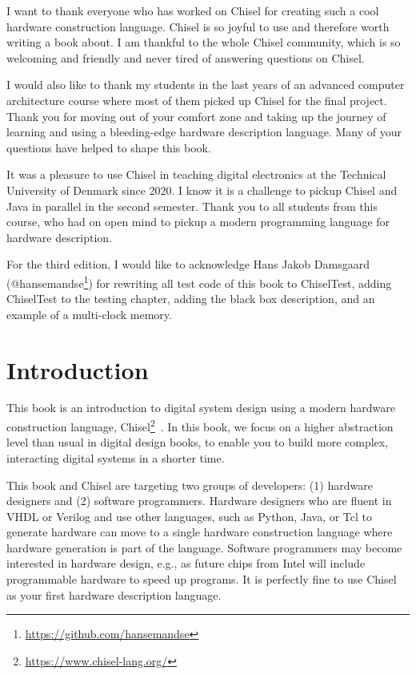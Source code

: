 \documentclass[%
    10pt,
    headinclude, footexclude,
    openright, %
    notitlepage,
    cleardoubleempty,
    headsepline,
    pointlessnumbers,
    bibtotoc, idxtotoc,
    ]{scrbook}
\newcommand{\myref}[2]{\href{#1}{#2}}
\renewcommand{\myref}[2]{{#2}{\footnote{\url{#1}}}}
\begin{document}
I want to thank everyone who has worked on Chisel for creating such
a cool hardware construction language. Chisel is so joyful to use and
therefore worth writing a book about.
I am thankful to the whole Chisel community, which is so welcoming and friendly
and never tired of answering questions on Chisel.

I would also like to thank my students in the last years of an advanced computer
architecture course where most of them picked up Chisel for the final project.
Thank you for moving out of your comfort zone and taking up the journey of
learning and using a bleeding-edge hardware description language.
Many of your questions have helped to shape this book.

It was a pleasure to use Chisel in teaching digital electronics
at the Technical University of Denmark since 2020.
I know it is a challenge to pickup Chisel and Java in parallel in the second
semester. Thank you to all students from this course, who had on open mind to
pickup a modern programming language for hardware description.

For the third edition, I would like to acknowledge Hans Jakob Damsgaard
(\myref{https://github.com/hansemandse}{@hansemandse}) for rewriting
all test code of this book to ChiselTest, adding ChiselTest to the testing chapter, adding the black
box description, and an example of a multi-clock memory.


\mainmatter

\chapter{Introduction}
\label{sec:intro}

This book is an introduction to digital system design using a modern hardware
construction language, \myref{https://www.chisel-lang.org/}{Chisel}~\cite{chisel:dac2012}.
In this book, we focus on a higher abstraction level than usual in digital design books,
to enable you to build more complex, interacting digital systems in a shorter time.

This book and Chisel are targeting two groups of developers:
(1) hardware designers and (2) software programmers.
Hardware designers who are fluent in VHDL or Verilog and use other languages, such as Python,
Java, or Tcl to generate hardware can move to a single hardware construction language
where hardware generation is part of the language.
Software programmers may become interested in hardware design,
e.g., as future chips from Intel will include programmable hardware to speed up programs.
It is perfectly fine to use Chisel as your first hardware description language.
\end{document}
